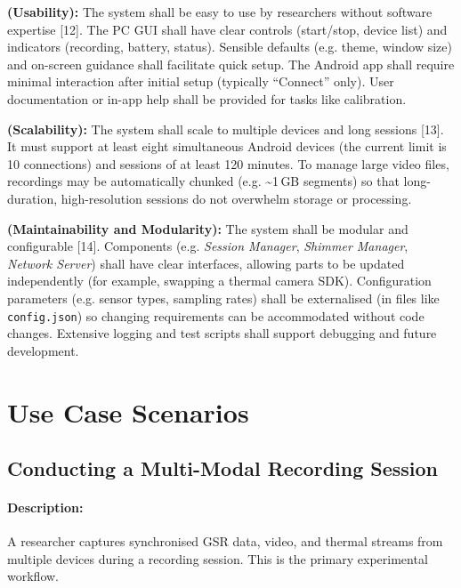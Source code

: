 \begin{description}[style=unboxed,leftmargin=0cm]
    \item[\textbf{NFR6}] \textbf{(Usability):} The system shall be easy to use by researchers without software expertise [12]. The PC GUI shall have clear controls (start/stop, device list) and indicators (recording, battery, status). Sensible defaults (e.g. theme, window size) and on-screen guidance shall facilitate quick setup. The Android app shall require minimal interaction after initial setup (typically “Connect” only). User documentation or in-app help shall be provided for tasks like calibration.

    \item[\textbf{NFR7}] \textbf{(Scalability):} The system shall scale to multiple devices and long sessions [13]. It must support at least eight simultaneous Android devices (the current limit is 10 connections) and sessions of at least 120 minutes. To manage large video files, recordings may be automatically chunked (e.g. \textasciitilde1\,GB segments) so that long-duration, high-resolution sessions do not overwhelm storage or processing.

    \item[\textbf{NFR8}] \textbf{(Maintainability and Modularity):} The system shall be modular and configurable [14]. Components (e.g. \textit{Session Manager}, \textit{Shimmer Manager}, \textit{Network Server}) shall have clear interfaces, allowing parts to be updated independently (for example, swapping a thermal camera SDK). Configuration parameters (e.g. sensor types, sampling rates) shall be externalised (in files like \texttt{config.json}) so changing requirements can be accommodated without code changes. Extensive logging and test scripts shall support debugging and future development.
\end{description}


\section{Use Case Scenarios}

\subsection{Conducting a Multi-Modal Recording Session}

\paragraph{Description:} A researcher captures synchronised GSR data, video, and thermal streams from multiple devices during a recording session. This is the primary experimental workflow.

